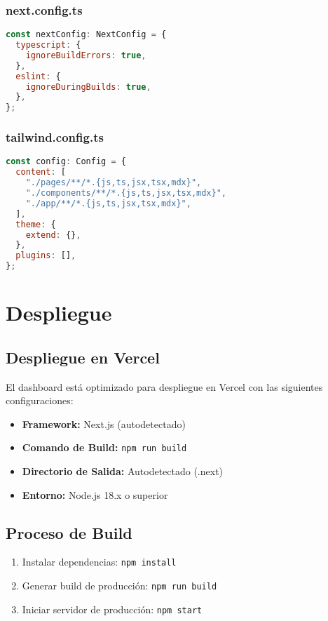 \documentclass[12pt,a4paper]{article}
\begin{document}
\subsubsection{next.config.ts}
\begin{lstlisting}[language=JavaScript]
const nextConfig: NextConfig = {
  typescript: {
    ignoreBuildErrors: true,
  },
  eslint: {
    ignoreDuringBuilds: true,
  },
};
\end{lstlisting}

\subsubsection{tailwind.config.ts}
\begin{lstlisting}[language=JavaScript]
const config: Config = {
  content: [
    "./pages/**/*.{js,ts,jsx,tsx,mdx}",
    "./components/**/*.{js,ts,jsx,tsx,mdx}",
    "./app/**/*.{js,ts,jsx,tsx,mdx}",
  ],
  theme: {
    extend: {},
  },
  plugins: [],
};
\end{lstlisting}

\section{Despliegue}

\subsection{Despliegue en Vercel}

El dashboard está optimizado para despliegue en Vercel con las siguientes configuraciones:

\begin{itemize}
    \item \textbf{Framework:} Next.js (autodetectado)
    \item \textbf{Comando de Build:} \texttt{npm run build}
    \item \textbf{Directorio de Salida:} Autodetectado (.next)
    \item \textbf{Entorno:} Node.js 18.x o superior
\end{itemize}

\subsection{Proceso de Build}

\begin{enumerate}
    \item Instalar dependencias: \texttt{npm install}
    \item Generar build de producción: \texttt{npm run build}
    \item Iniciar servidor de producción: \texttt{npm start}
\end{enumerate}
\end{document}

